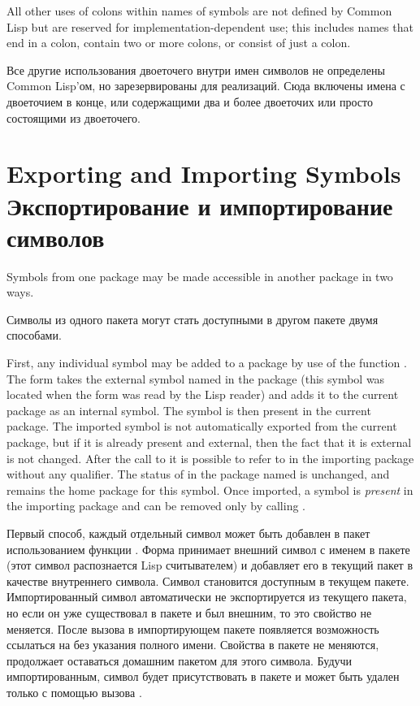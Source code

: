 All other uses of colons within names of symbols are not defined by
Common Lisp but are reserved for implementation-dependent use; this
includes names that end in a colon, contain two or more colons, or
consist of just a colon.

Все другие использования двоеточего внутри имен символов не определены Common
Lisp'ом, но зарезервированы для реализаций. Сюда включены имена с двоеточием в
конце, или содержащими два и более двоеточих или просто состоящими из
двоеточего.

\section{Exporting and Importing Symbols Экспортирование и импортирование
  символов} 
\label{EXPORT-IMPORT-SECTION}

Symbols from one package may be made accessible in another package in
two ways.

Символы из одного пакета могут стать доступными в другом пакете двумя способами.

First, any individual symbol may be added to a package by use
of the function .  The form  takes
the external symbol named  in the  package (this
symbol was located when the form was read by the Lisp reader) and adds
it to the current package as an internal symbol.  The symbol is then
present in the current package.  The imported symbol is
not automatically exported from the current package, but if it is
already present and external, then the fact that it
is external is not changed.  After the call to
 it is possible to refer to  in the importing package
without any qualifier.  The status of  in the package named
 is unchanged, and  remains the home package for
this symbol.  Once imported, a symbol is \emph{present} in the
importing package and can be removed only by calling .

Первый способ, каждый отдельный символ может быть добавлен в пакет использованием
функции . Форма  принимает внешний
символ с именем  в пакете  (этот символ распознается Lisp
считывателем) и добавляет его в текущий пакет в качестве внутреннего
символа. Символ становится доступным в текущем пакете. Импортированный символ
автоматически не экспортируется из текущего пакета, но если он уже существовал в
пакете и был внешним, то это свойство не меняется. После вызова 
в импортирующем пакете появляется возможность ссылаться на  без
указания полного имени. Свойства  в пакете  не меняются,
 продолжает оставаться домашним пакетом для этого символа. Будучи
импортированным, символ будет присутствовать в пакете и может быть удален только
с помощью вызова .

